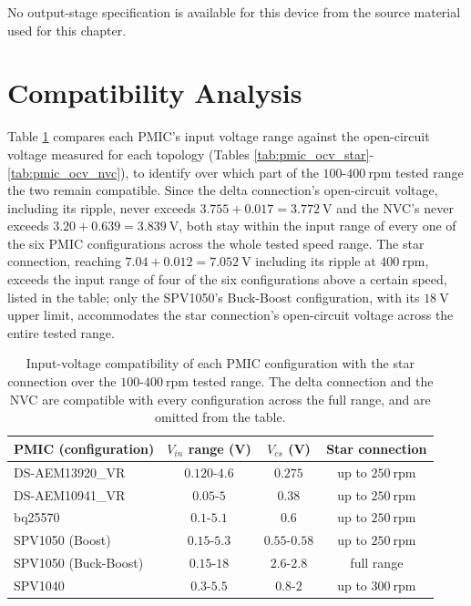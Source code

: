 No output-stage specification is available for this device from the source material used for this chapter.

\section{Compatibility Analysis}
\label{sec:pmic_compatibility}

Table \ref{tab:pmic_compatibility} compares each PMIC's input voltage range against the open-circuit voltage measured for each topology (Tables \ref{tab:pmic_ocv_star}-\ref{tab:pmic_ocv_nvc}), to identify over which part of the $100$-$400\ \text{rpm}$ tested range the two remain compatible. Since the delta connection's open-circuit voltage, including its ripple, never exceeds $3.755+0.017=3.772\ \text{V}$ and the NVC's never exceeds $3.20+0.639=3.839\ \text{V}$, both stay within the input range of every one of the six PMIC configurations across the whole tested speed range. The star connection, reaching $7.04+0.012=7.052\ \text{V}$ including its ripple at $400\ \text{rpm}$, exceeds the input range of four of the six configurations above a certain speed, listed in the table; only the SPV1050's Buck-Boost configuration, with its $18\ \text{V}$ upper limit, accommodates the star connection's open-circuit voltage across the entire tested range.

\begin{table}[htbp]
    \centering
    \begin{tabular}{lccc}
        \toprule
        PMIC (configuration) & $V_{in}$ range (V) & $V_{cs}$ (V) & Star connection \\
        \midrule
        DS-AEM13920\_VR & $0.120$-$4.6$ & $0.275$ & up to $250\ \text{rpm}$ \\
        DS-AEM10941\_VR & $0.05$-$5$ & $0.38$ & up to $250\ \text{rpm}$ \\
        bq25570 & $0.1$-$5.1$ & $0.6$ & up to $250\ \text{rpm}$ \\
        SPV1050 (Boost) & $0.15$-$5.3$ & $0.55$-$0.58$ & up to $250\ \text{rpm}$ \\
        SPV1050 (Buck-Boost) & $0.15$-$18$ & $2.6$-$2.8$ & full range \\
        SPV1040 & $0.3$-$5.5$ & $0.8$-$2$ & up to $300\ \text{rpm}$ \\
        \bottomrule
    \end{tabular}
    \caption{Input-voltage compatibility of each PMIC configuration with the star connection over the $100$-$400\ \text{rpm}$ tested range. The delta connection and the NVC are compatible with every configuration across the full range, and are omitted from the table.}
    \label{tab:pmic_compatibility}
\end{table}

